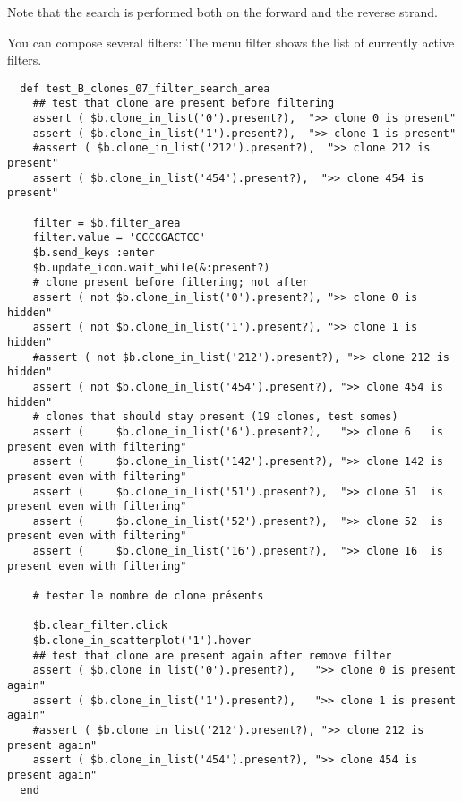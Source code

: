 Note that the search is performed both on the forward and the reverse strand.

You can compose several filters:
The menu filter shows the list of currently active filters.

\begin{verbatim}
  def test_B_clones_07_filter_search_area
    ## test that clone are present before filtering
    assert ( $b.clone_in_list('0').present?),  ">> clone 0 is present"
    assert ( $b.clone_in_list('1').present?),  ">> clone 1 is present"
    #assert ( $b.clone_in_list('212').present?),  ">> clone 212 is present"
    assert ( $b.clone_in_list('454').present?),  ">> clone 454 is present"

    filter = $b.filter_area
    filter.value = 'CCCCGACTCC'
    $b.send_keys :enter
    $b.update_icon.wait_while(&:present?)
    # clone present before filtering; not after
    assert ( not $b.clone_in_list('0').present?), ">> clone 0 is hidden"
    assert ( not $b.clone_in_list('1').present?), ">> clone 1 is hidden"
    #assert ( not $b.clone_in_list('212').present?), ">> clone 212 is hidden"
    assert ( not $b.clone_in_list('454').present?), ">> clone 454 is hidden"
    # clones that should stay present (19 clones, test somes)
    assert (     $b.clone_in_list('6').present?),   ">> clone 6   is present even with filtering"
    assert (     $b.clone_in_list('142').present?), ">> clone 142 is present even with filtering"
    assert (     $b.clone_in_list('51').present?),  ">> clone 51  is present even with filtering"
    assert (     $b.clone_in_list('52').present?),  ">> clone 52  is present even with filtering"
    assert (     $b.clone_in_list('16').present?),  ">> clone 16  is present even with filtering"

    # tester le nombre de clone présents

    $b.clear_filter.click
    $b.clone_in_scatterplot('1').hover
    ## test that clone are present again after remove filter
    assert ( $b.clone_in_list('0').present?),   ">> clone 0 is present again"
    assert ( $b.clone_in_list('1').present?),   ">> clone 1 is present again"
    #assert ( $b.clone_in_list('212').present?), ">> clone 212 is present again"
    assert ( $b.clone_in_list('454').present?), ">> clone 454 is present again"
  end
\end{verbatim}  
\bigskip

